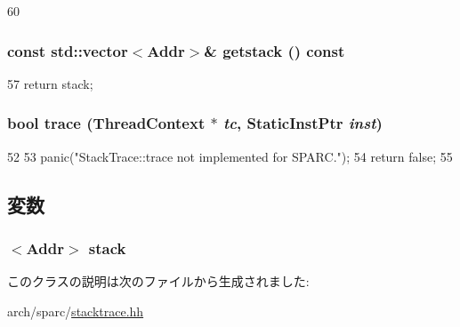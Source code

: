 \begin{DoxyCode}
60 {}
\end{DoxyCode}
\hypertarget{classSparcISA_1_1StackTrace_aceb93ba31a3756aca859b4643efeeb46}{
\subsubsection[{getstack}]{\setlength{\rightskip}{0pt plus 5cm}const {\bf std::vector}$<${\bf Addr}$>$\& getstack () const}}
\label{classSparcISA_1_1StackTrace_aceb93ba31a3756aca859b4643efeeb46}



\begin{DoxyCode}
57 { return stack; }
\end{DoxyCode}
\hypertarget{classSparcISA_1_1StackTrace_aabb136846a5e22007e44db846652ddd5}{
\subsubsection[{trace}]{\setlength{\rightskip}{0pt plus 5cm}bool trace ({\bf ThreadContext} $\ast$ {\em tc}, \/  {\bf StaticInstPtr} {\em inst})}}
\label{classSparcISA_1_1StackTrace_aabb136846a5e22007e44db846652ddd5}



\begin{DoxyCode}
52     {
53         panic("StackTrace::trace not implemented for SPARC.\n");
54         return false;
55     }
\end{DoxyCode}


\subsection{変数}
\hypertarget{classSparcISA_1_1StackTrace_a8be39169db4f31c77f5188de23c602f1}{
\subsubsection[{stack}]{$<${\bf Addr}$>$ {\bf stack}}}
\label{classSparcISA_1_1StackTrace_a8be39169db4f31c77f5188de23c602f1}


このクラスの説明は次のファイルから生成されました:\begin{DoxyCompactItemize}
\item 
arch/sparc/\hyperlink{sparc_2stacktrace_8hh}{stacktrace.hh}\end{DoxyCompactItemize}
